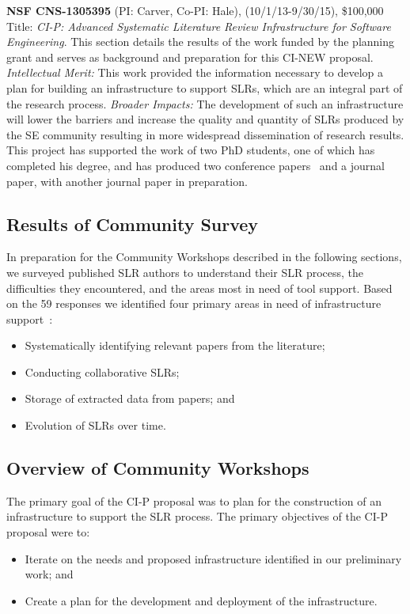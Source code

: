 \textbf{NSF CNS-1305395} (PI: Carver, Co-PI: Hale), (10/1/13-9/30/15), \$100,000 Title: \emph{CI-P: Advanced Systematic Literature Review Infrastructure for Software Engineering}. 
This section details the results of the work funded by the planning grant and serves as background and preparation for this CI-NEW proposal.
\textit{Intellectual Merit:} This work provided the information necessary to develop a plan for building an infrastructure to support SLRs, which are an integral part of the research process.
\textit{Broader Impacts:} The development of such an infrastructure will lower the barriers and increase the quality and quantity of SLRs produced by the SE community resulting in more widespread dissemination of research results.
This project has supported the work of two PhD students, one of which has completed his degree, and has produced two conference papers~\cite{Carver-etal:13, Hassler-etal:14} and a journal paper\cite{Hassler-etal:16}, with another journal paper in preparation.

\subsection{Results of Community Survey}
In preparation for the Community Workshops described in the following sections, we surveyed published SLR authors to understand their SLR process, the difficulties they encountered, and the areas most in need of tool support.
Based on the 59 responses we identified four primary areas in need of infrastructure support~\cite{Carver-etal:13}:
\vspace{-8pt}
\begin{itemize}
	\item Systematically identifying relevant papers from the literature;
	\vspace{-4pt}
	\item Conducting collaborative SLRs;
	\vspace{-4pt}
	\item Storage of extracted data from papers; and
	\vspace{-4pt}
	\item Evolution of SLRs over time.
\end{itemize}

\subsection{Overview of Community Workshops}
\label{sec:overview:workshops}
The primary goal of the CI-P proposal was to plan for the construction of an infrastructure to support the SLR process. 
The primary objectives of the CI-P proposal were to:
\vspace{-8pt}
\begin{itemize}
	\item Iterate on the needs and proposed infrastructure identified in our preliminary work; and
	\vspace{-4pt}
	\item Create a plan for the development and deployment of the infrastructure.
\end{itemize}
\vspace{-4pt}

